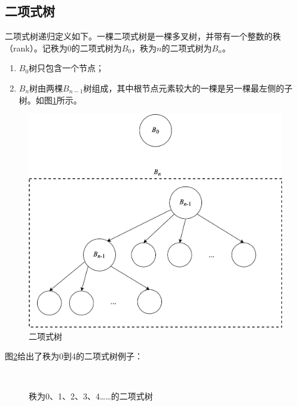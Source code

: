 \documentclass[b5paper]{ctexart}
\begin{document}
\subsection{二项式树}
\label{Binomial tree} 

二项式树递归定义如下。一棵二项式树是一棵多叉树，并带有一个整数的秩（rank）。记秩为0的二项式树为$B_0$，秩为$n$的二项式树为$B_n$。

\begin{enumerate}
\item $B_0$树只包含一个节点；
\item $B_n$树由两棵$B_{n-1}$树组成，其中根节点元素较大的一棵是另一棵最左侧的子树。如图\ref{fig:link-bitree}所示。
\end{enumerate}

\begin{figure}[htbp]
  \centering
  \includegraphics[scale=0.5]{img/btrees}
  \caption{二项式树}
  \label{fig:link-bitree}
\end{figure}

图\ref{fig:bitree-forms}给出了秩为0到4的二项式树例子：

\begin{figure}[htbp]
  \centering
   \\
  \caption{秩为0、1、2、3、4……的二项式树}
  \label{fig:bitree-forms}
\end{figure}
\end{document}
